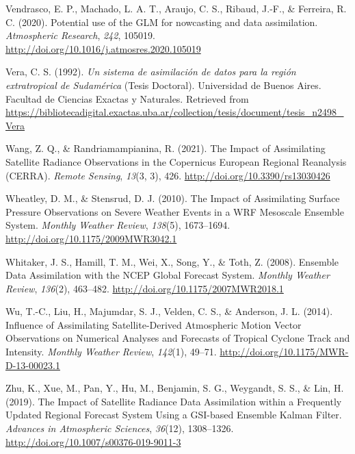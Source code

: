 \documentclass[12pt,twoside]{reedthesis}
\begin{document}
\leavevmode\hypertarget{ref-vendrasco2020}{}%
Vendrasco, E. P., Machado, L. A. T., Araujo, C. S., Ribaud, J.-F., \& Ferreira, R. C. (2020). Potential use of the GLM for nowcasting and data assimilation. \emph{Atmospheric Research}, \emph{242}, 105019. \url{http://doi.org/10.1016/j.atmosres.2020.105019}

\leavevmode\hypertarget{ref-vera1992}{}%
Vera, C. S. (1992). \emph{Un sistema de asimilación de datos para la región extratropical de Sudamérica} (Tesis Doctoral). Universidad de Buenos Aires. Facultad de Ciencias Exactas y Naturales. Retrieved from \url{https://bibliotecadigital.exactas.uba.ar/collection/tesis/document/tesis_n2498_Vera}

\leavevmode\hypertarget{ref-wang2021}{}%
Wang, Z. Q., \& Randriamampianina, R. (2021). The Impact of Assimilating Satellite Radiance Observations in the Copernicus European Regional Reanalysis (CERRA). \emph{Remote Sensing}, \emph{13}(3, 3), 426. \url{http://doi.org/10.3390/rs13030426}

\leavevmode\hypertarget{ref-wheatley2010}{}%
Wheatley, D. M., \& Stensrud, D. J. (2010). The Impact of Assimilating Surface Pressure Observations on Severe Weather Events in a WRF Mesoscale Ensemble System. \emph{Monthly Weather Review}, \emph{138}(5), 1673--1694. \url{http://doi.org/10.1175/2009MWR3042.1}

\leavevmode\hypertarget{ref-whitaker2008}{}%
Whitaker, J. S., Hamill, T. M., Wei, X., Song, Y., \& Toth, Z. (2008). Ensemble Data Assimilation with the NCEP Global Forecast System. \emph{Monthly Weather Review}, \emph{136}(2), 463--482. \url{http://doi.org/10.1175/2007MWR2018.1}

\leavevmode\hypertarget{ref-wu2014}{}%
Wu, T.-C., Liu, H., Majumdar, S. J., Velden, C. S., \& Anderson, J. L. (2014). Influence of Assimilating Satellite-Derived Atmospheric Motion Vector Observations on Numerical Analyses and Forecasts of Tropical Cyclone Track and Intensity. \emph{Monthly Weather Review}, \emph{142}(1), 49--71. \url{http://doi.org/10.1175/MWR-D-13-00023.1}

\leavevmode\hypertarget{ref-zhu2019}{}%
Zhu, K., Xue, M., Pan, Y., Hu, M., Benjamin, S. G., Weygandt, S. S., \& Lin, H. (2019). The Impact of Satellite Radiance Data Assimilation within a Frequently Updated Regional Forecast System Using a GSI-based Ensemble Kalman Filter. \emph{Advances in Atmospheric Sciences}, \emph{36}(12), 1308--1326. \url{http://doi.org/10.1007/s00376-019-9011-3}


\end{document}
